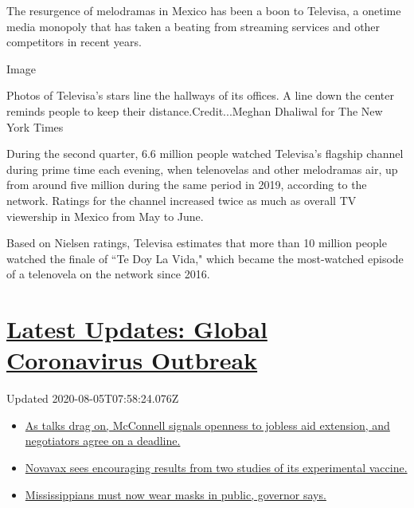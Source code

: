 The resurgence of melodramas in Mexico has been a boon to Televisa, a
onetime media monopoly that has taken a beating from streaming services
and other competitors in recent years.

Image

Photos of Televisa's stars line the hallways of its offices. A line down
the center reminds people to keep their distance.Credit...Meghan
Dhaliwal for The New York Times

During the second quarter, 6.6 million people watched Televisa's
flagship channel during prime time each evening, when telenovelas and
other melodramas air, up from around five million during the same period
in 2019, according to the network. Ratings for the channel increased
twice as much as overall TV viewership in Mexico from May to June.

Based on Nielsen ratings, Televisa estimates that more than 10 million
people watched the finale of ``Te Doy La Vida," which became the
most-watched episode of a telenovela on the network since 2016.

\hypertarget{latest-updates-global-coronavirus-outbreak}{%
\section{\texorpdfstring{\href{https://www.nytimes.com/2020/08/04/world/coronavirus-cases.html?action=click\&pgtype=Article\&state=default\&region=MAIN_CONTENT_1\&context=storylines_live_updates}{Latest
Updates: Global Coronavirus
Outbreak}}{Latest Updates: Global Coronavirus Outbreak}}\label{latest-updates-global-coronavirus-outbreak}}

Updated 2020-08-05T07:58:24.076Z

\begin{itemize}
\tightlist
\item
  \href{https://www.nytimes.com/2020/08/04/world/coronavirus-cases.html?action=click\&pgtype=Article\&state=default\&region=MAIN_CONTENT_1\&context=storylines_live_updates\#link-762df92}{As
  talks drag on, McConnell signals openness to jobless aid extension,
  and negotiators agree on a deadline.}
\item
  \href{https://www.nytimes.com/2020/08/04/world/coronavirus-cases.html?action=click\&pgtype=Article\&state=default\&region=MAIN_CONTENT_1\&context=storylines_live_updates\#link-1228a480}{Novavax
  sees encouraging results from two studies of its experimental
  vaccine.}
\item
  \href{https://www.nytimes.com/2020/08/04/world/coronavirus-cases.html?action=click\&pgtype=Article\&state=default\&region=MAIN_CONTENT_1\&context=storylines_live_updates\#link-794484ed}{Mississippians
  must now wear masks in public, governor says.}
\end{itemize}

